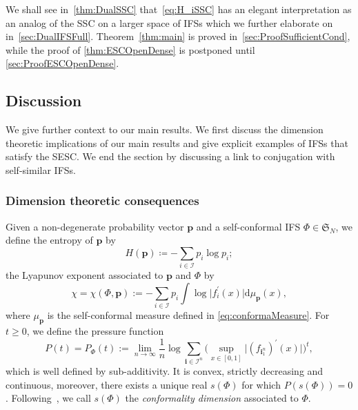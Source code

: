 \documentclass[11pt,]{article}
\def\cref#1{\ref{#1}}%
\theoremstyle{definition}
\theoremstyle{remark}
\newcommand{\0}{\mathbf{0}}
\newcommand{\bi}{\mathbf{i}}
\numberwithin{equation}{section}
\begin{document}
We shall see in~\cref{thm:DualSSC} that~\cref{eq:H_iSSC} has an elegant interpretation as an analog
of the SSC on a larger space of IFSs which we further elaborate on in~\cref{sec:DualIFSFull}. 
Theorem~\ref{thm:main} is proved in~\cref{sec:ProofSufficientCond}, while the proof of
\cref{thm:ESCOpenDense} is postponed until \cref{sec:ProofESCOpenDense}.

\subsection{Discussion}
We give further context to our main results. We first discuss the dimension theoretic implications
of our main results and  give explicit examples of IFSs that satisfy the SESC. We end the section by
discussing a link to conjugation with self-similar IFSs.

\subsubsection{Dimension theoretic consequences}
Given a non-degenerate probability vector $\mathbf{p}$ and a self-conformal IFS $\Phi\in
\mathfrak{S}_N$, we define the entropy of $\mathbf{p}$ by
\begin{equation*}
H(\mathbf{p})\coloneqq -\sum_{i\in\mathcal{I}} p_i\log p_i;
\end{equation*}
the Lyapunov exponent associated to $\mathbf{p}$ and $\Phi$ by
\begin{equation*}
\chi=\chi(\Phi,\mathbf{p}):=-\sum_{i \in \mathcal{I}} p_i \int \log \big|f_{i}^{'}(x)\big|
\mathrm{d} \mu_{\mathbf{p}}(x),
\end{equation*}
where $\mu_{\mathbf{p}}$ is the self-conformal measure defined in \cref{eq:conformaMeasure}.
For $t\geq 0$, we define the pressure function
\begin{equation*}
P(t)=P_{\Phi}(t):=\lim _{n \rightarrow \infty} \frac{1}{n} \log \sum_{\bi \in
\mathcal{I}^n} \Big(\sup_{x\in[0,1]} \big|(f_{\bi_1^n})^{\prime}(x)\big|\Big)^t,
\end{equation*}
which is well defined by sub-additivity. It is convex, strictly decreasing and continuous, moreover,
there exists a unique real $s(\Phi)$ for which $P(s(\Phi))=0$.
Following~\cite[Chapter~14]{BaranySimonSolomyak_Book23}, we call $s(\Phi)$ the \emph{conformality
dimension} associated to $\Phi$. 
\end{document}
